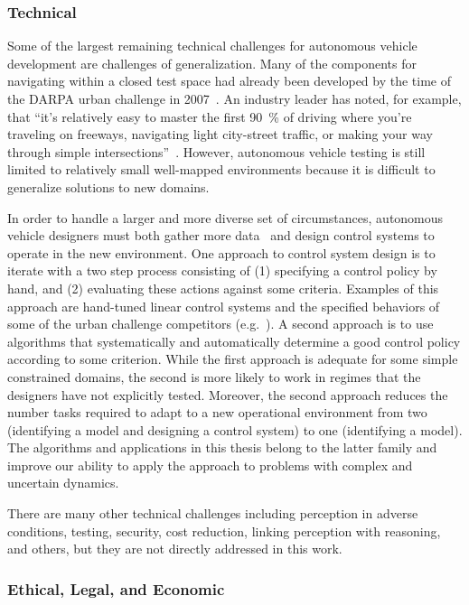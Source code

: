\subsubsection{Technical}

Some of the largest remaining technical challenges for autonomous vehicle development are challenges of generalization.
Many of the components for navigating within a closed test space had already been developed by the time of the DARPA urban challenge in 2007~\cite{MB-KI-SS:10}.
An industry leader has noted, for example, that ``it's relatively easy to master the first \SI{90}{\percent} of driving where you're traveling on freeways, navigating light city-street traffic, or making your way through simple intersections''~\cite{dolgov2016google}.
However, autonomous vehicle testing is still limited to relatively small well-mapped environments because it is difficult to generalize solutions to new domains.

In order to handle a larger and more diverse set of circumstances, autonomous vehicle designers must both gather more data~\cite{dolgov2016google} and design control systems to operate in the new environment.
One approach to control system design is to iterate with a two step process consisting of (1) specifying a control policy by hand, and (2) evaluating these actions against some criteria.
Examples of this approach are hand-tuned linear control systems and the specified behaviors of some of the urban challenge competitors (e.g.~\citet{urmson2007tartan}).
A second approach is to use algorithms that systematically and automatically determine a good control policy according to some criterion.
While the first approach is adequate for some simple constrained domains, the second is more likely to work in regimes that the designers have not explicitly tested.
Moreover, the second approach reduces the number tasks required to adapt to a new operational environment from two (identifying a model and designing a control system) to one (identifying a model).
The algorithms and applications in this thesis belong to the latter family and improve our ability to apply the approach to problems with complex and uncertain dynamics.

There are many other technical challenges including perception in adverse conditions, testing, security, cost reduction, linking perception with reasoning, and others, but they are not directly addressed in this work.

\subsubsection{Ethical, Legal, and Economic}

